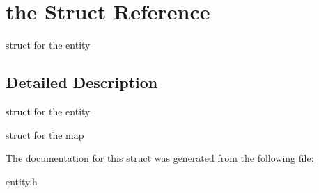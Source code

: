 \hypertarget{structthe}{}\section{the Struct Reference}
\label{structthe}


struct for the entity  




\subsection{Detailed Description}
struct for the entity 

struct for the map 

The documentation for this struct was generated from the following file\+:\begin{DoxyCompactItemize}
\item 
entity.\+h\end{DoxyCompactItemize}
